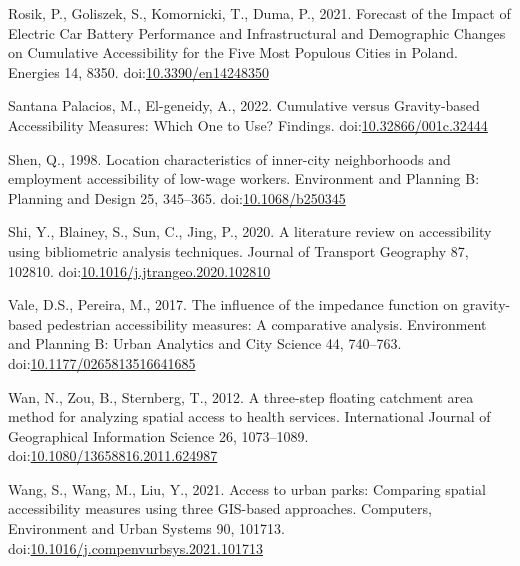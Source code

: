 \documentclass[]{elsarticle} %
\newlength{\cslhangindent}
\newlength{\cslentryspacingunit} %
\newenvironment{CSLReferences}[2] %
 {%
  \setlength{\parindent}{0pt}
  \ifodd #1
  \let\oldpar\par
  \def\par{\hangindent=\cslhangindent\oldpar}
  \fi
  \setlength{\parskip}{#2\cslentryspacingunit}
 }%
 {}
\begin{document}
\begin{CSLReferences}{1}{0}
\leavevmode{}%
Rosik, P., Goliszek, S., Komornicki, T., Duma, P., 2021. Forecast of the
{Impact} of {Electric} {Car} {Battery} {Performance} and
{Infrastructural} and {Demographic} {Changes} on {Cumulative}
{Accessibility} for the {Five} {Most} {Populous} {Cities} in {Poland}.
Energies 14, 8350.
doi:\href{https://doi.org/10.3390/en14248350}{10.3390/en14248350}

\leavevmode{}%
Santana Palacios, M., El-geneidy, A., 2022. Cumulative versus
Gravity-based Accessibility Measures: Which One to Use? Findings.
doi:\href{https://doi.org/10.32866/001c.32444}{10.32866/001c.32444}

\leavevmode{}%
Shen, Q., 1998. Location characteristics of inner-city neighborhoods and
employment accessibility of low-wage workers. Environment and Planning
B: Planning and Design 25, 345--365.
doi:\href{https://doi.org/10.1068/b250345}{10.1068/b250345}

\leavevmode{}%
Shi, Y., Blainey, S., Sun, C., Jing, P., 2020. A literature review on
accessibility using bibliometric analysis techniques. Journal of
Transport Geography 87, 102810.
doi:\href{https://doi.org/10.1016/j.jtrangeo.2020.102810}{10.1016/j.jtrangeo.2020.102810}

\leavevmode{}%
Vale, D.S., Pereira, M., 2017. The influence of the impedance function
on gravity-based pedestrian accessibility measures: {A} comparative
analysis. Environment and Planning B: Urban Analytics and City Science
44, 740--763.
doi:\href{https://doi.org/10.1177/0265813516641685}{10.1177/0265813516641685}

\leavevmode{}%
Wan, N., Zou, B., Sternberg, T., 2012. A three-step floating catchment
area method for analyzing spatial access to health services.
International Journal of Geographical Information Science 26,
1073--1089.
doi:\href{https://doi.org/10.1080/13658816.2011.624987}{10.1080/13658816.2011.624987}

\leavevmode{}%
Wang, S., Wang, M., Liu, Y., 2021. Access to urban parks: {Comparing}
spatial accessibility measures using three {GIS}-based approaches.
Computers, Environment and Urban Systems 90, 101713.
doi:\href{https://doi.org/10.1016/j.compenvurbsys.2021.101713}{10.1016/j.compenvurbsys.2021.101713}


\end{CSLReferences}
\end{document}
